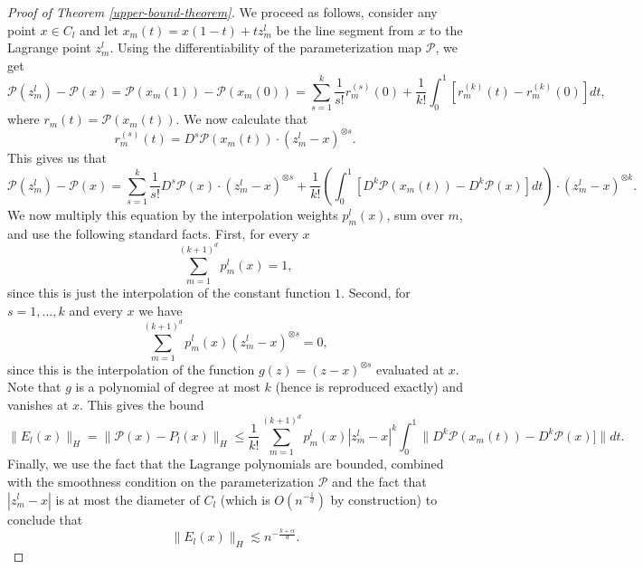 \begin{proof}[Proof of Theorem \ref{upper-bound-theorem}]
 We proceed as follows, consider any point $x\in C_l$ and let $x_m(t) = x(1-t) + tz^l_m$ be the line segment from $x$ to the Lagrange point $z^l_m$. Using the differentiability of the parameterization map $\mathcal{P}$, we get
 \begin{equation}
  \mathcal{P}(z^l_m) - \mathcal{P}(x) = \mathcal{P}(x_m(1)) - \mathcal{P}(x_m(0)) = \sum_{s=1}^k \frac{1}{s!}r_{m}^{(s)}(0) + \frac{1}{k!}\int_0^1 [r_{m}^{(k)}(t) - r_{m}^{(k)}(0)]dt,
 \end{equation}
 where $r_{m}(t) = \mathcal{P}(x_m(t))$. We now calculate that
 \begin{equation}
  r_{m}^{(s)}(t) = D^s\mathcal{P}(x_m(t))\cdot(z_m^l - x)^{\otimes s}.
 \end{equation}
 This gives us that
 \begin{equation}
  \mathcal{P}(z^l_m) - \mathcal{P}(x) = \sum_{s=1}^k \frac{1}{s!}D^s\mathcal{P}(x)\cdot(z_m^l - x)^{\otimes s} + \frac{1}{k!}\left(\int_0^1 [D^k\mathcal{P}(x_m(t)) - D^k\mathcal{P}(x)]dt\right)\cdot(z_m^l - x)^{\otimes k}.
 \end{equation}
 We now multiply this equation by the interpolation weights $p_m^l(x)$, sum over $m$, and use the following standard facts. First, for every $x$
 \begin{equation}
  \sum_{m=1}^{(k+1)^d} p_m^l(x) = 1,
 \end{equation}
 since this is just the interpolation of the constant function $1$. Second, for $s=1,...,k$ and every $x$ we have
 \begin{equation}
  \sum_{m=1}^{(k+1)^d} p_m^l(x)(z_m^l - x)^{\otimes s} = 0,
 \end{equation}
 since this is the interpolation of the function $g(z) = (z-x)^{\otimes s}$ evaluated at $x$. Note that $g$ is a polynomial of degree at most $k$ (hence is reproduced exactly) and vanishes at $x$. This gives the bound
 \begin{equation}
  \|E_l(x)\|_H = \|\mathcal{P}(x) - P_l(x)\|_H \leq \frac{1}{k!}\sum_{m=1}^{(k+1)^d} p_m^l(x)|z_m^l - x|^k\int_0^1\|D^k\mathcal{P}(x_m(t)) - D^k\mathcal{P}(x)]\|dt.
 \end{equation}
 Finally, we use the fact that the Lagrange polynomials are bounded, combined with the smoothness condition on the parameterization $\mathcal{P}$ and the fact that $|z_m^l - x|$ is at most the diameter of $C_l$ (which is $O(n^{-\frac{1}{d}})$ by construction) to conclude that
 \begin{equation}
  \|E_l(x)\|_H \lesssim n^{-\frac{k+\alpha}{d}}.
 \end{equation}
 

\end{proof}
